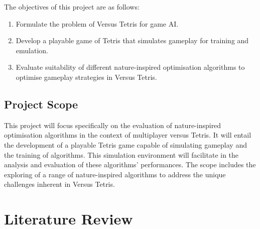 \documentclass[a4paper, 12pt]{extreport}
\begin{document}
			The objectives of this project are as follows:
			
			\begin{enumerate}
				\item Formulate the problem of Versus Tetris for game AI.
				\item Develop a playable game of Tetris that simulates gameplay for training and emulation.
				\item Evaluate suitability of different nature-inspired optimisation algorithms to optimise gameplay strategies in Versus Tetris.
			\end{enumerate}
		
		\section{Project Scope}
			
			
			This project will focus specifically on the evaluation of nature-inspired optimisation algorithms in the context of multiplayer versus Tetris. It will entail the development of a playable Tetris game capable of simulating gameplay and the training of algorithms. This simulation environment will facilitate in the analysis and evaluation of these algorithms' performances. The scope includes the exploring of a range of nature-inspired algorithms to address the unique challenges inherent in Versus Tetris.
			
		
	
	\chapter{Literature Review}
		
		
\end{document}
